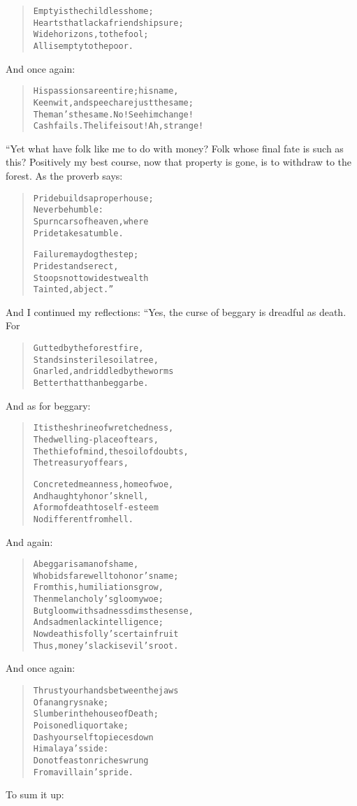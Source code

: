\documentclass[article, twoside, 14pt]{memoir}
\renewenvironment{verbatim}{%
\begin{quote}%
\vskip -10pt%
\begin{alltt}\normalfont\large}{\end{alltt}%
\end{quote}%
\vskip -10pt
} %
\begin{document}
\begin{verbatim}
Empty is the childless home;
    Hearts that lack a friendship sure;
Wide horizons, to the fool;
    All is empty to the poor.
\end{verbatim}
And once again:

\begin{verbatim}
His passions are entire; his name,
Keen wit, and speech are just the same;
The man's the same. No! See him change!
Cash fails. The life is out! Ah, strange!
\end{verbatim}
“Yet what have folk like me to do with money? Folk whose
final fate is such as this? Positively my best course, now that
property is gone, is to withdraw to the forest. As the proverb
says:

\begin{verbatim}
Pride builds a proper house;
    Never be humble:
Spurn cars of heaven, where
    Pride takes a tumble.

Failure may dog the step;
    Pride stands erect,
Stoops not to widest wealth
    Tainted, abject.”
\end{verbatim}
And I continued my reflections: “Yes, the curse of beggary is
dreadful as death. For

\begin{verbatim}
Gutted by the forest fire,
    Stands in sterile soil a tree,
Gnarled, and riddled by the worms{\textemdash}
    Better that than beggar be.
\end{verbatim}
And as for beggary:

\begin{verbatim}
It is the shrine of wretchedness,
    The dwelling-place of tears,
The thief of mind, the soil of doubts,
    The treasury of fears,

Concreted meanness, home of woe,
    And haughty honor's knell,
A form of death{\textemdash}to self-esteem
    No different from hell.
\end{verbatim}
And again:

\begin{verbatim}
A beggar is a man of shame,
Who bids farewell to honor's name;
From this, humiliations grow,
Then melancholy's gloomy woe;
But gloom with sadness dims the sense,
And sad men lack intelligence;
Now death is folly's certain fruit{\textemdash}
Thus, money's lack is evil's root.
\end{verbatim}
And once again:

\begin{verbatim}
Thrust your hands between the jaws
    Of an angry snake;
Slumber in the house of Death;
    Poisoned liquor take;
Dash yourself to pieces down
    Himalaya's side:
Do not feast on riches wrung
    From a villain's pride.
\end{verbatim}
To sum it up:
\end{document}
